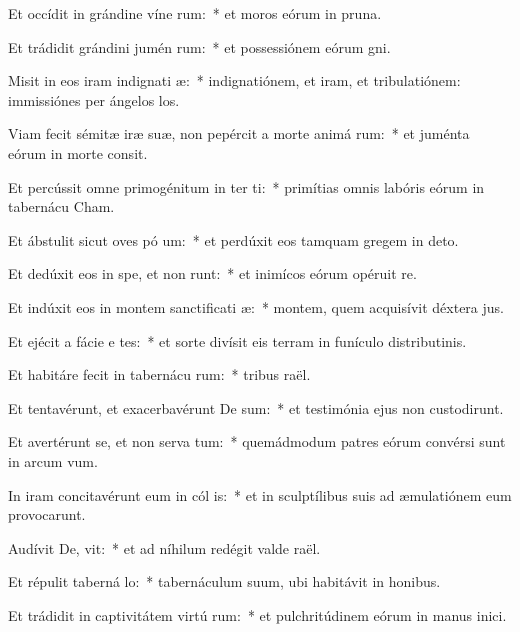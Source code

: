 \item Et occídit in grándine víne rum:~* et moros eórum in pruna.
\item Et trádidit grándini jumén rum:~* et possessiónem eórum gni.
\item Misit in eos iram indignati æ:~* indignatiónem, et iram, et tribulatiónem: immissiónes per ángelos los.
\item Viam fecit sémitæ iræ suæ, non pepércit a morte animá rum:~* et juménta eórum in morte consit.
\item Et percússit omne primogénitum in ter ti:~* primítias omnis labóris eórum in tabernácu Cham.
\item Et ábstulit sicut oves pó um:~* et perdúxit eos tamquam gregem in deto.
\item Et dedúxit eos in spe, et non runt:~* et inimícos eórum opéruit re.
\item Et indúxit eos in montem sanctificati æ:~* montem, quem acquisívit déxtera jus.
\item Et ejécit a fácie e tes:~* et sorte divísit eis terram in funículo distributinis.
\item Et habitáre fecit in tabernácu rum:~* tribus raël.
\item Et tentavérunt, et exacerbavérunt De sum:~* et testimónia ejus non custodirunt.
\item Et avertérunt se, et non serva tum:~* quemádmodum patres eórum convérsi sunt in arcum vum.
\item In iram concitavérunt eum in cól is:~* et in sculptílibus suis ad æmulatiónem eum provocarunt.
\item Audívit De,  vit:~* et ad níhilum redégit valde raël.
\item Et répulit taberná lo:~* tabernáculum suum, ubi habitávit in honibus.
\item Et trádidit in captivitátem virtú rum:~* et pulchritúdinem eórum in manus inici.
